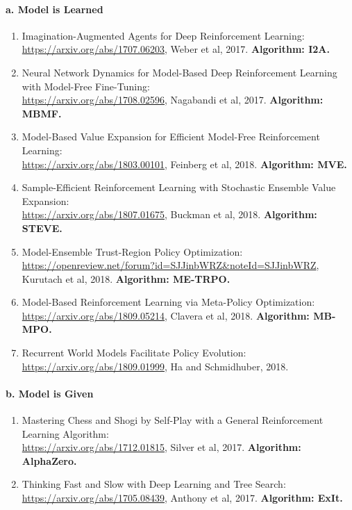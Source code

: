 \documentclass[lang=cn,11pt,a4paper]{elegant_template}
\begin{document}
\paragraph{a. Model is Learned}
\begin{enumerate}
    \item Imagination-Augmented Agents for Deep Reinforcement Learning:\\ \href{https://arxiv.org/abs/1707.06203}{https://arxiv.org/abs/1707.06203}, Weber et al, 2017. \textbf{Algorithm: I2A.}
    \item Neural Network Dynamics for Model-Based Deep Reinforcement Learning with Model-Free Fine-Tuning:\\ \href{https://arxiv.org/abs/1708.02596}{https://arxiv.org/abs/1708.02596}, Nagabandi et al, 2017. \textbf{Algorithm: MBMF.}
    \item Model-Based Value Expansion for Efficient Model-Free Reinforcement Learning:\\ \href{https://arxiv.org/abs/1803.00101}{https://arxiv.org/abs/1803.00101}, Feinberg et al, 2018. \textbf{Algorithm: MVE.}
    \item Sample-Efficient Reinforcement Learning with Stochastic Ensemble Value Expansion:\\ \href{https://arxiv.org/abs/1807.01675}{https://arxiv.org/abs/1807.01675}, Buckman et al, 2018. \textbf{Algorithm: STEVE.}
    \item Model-Ensemble Trust-Region Policy Optimization:\\ \href{https://openreview.net/forum?id=SJJinbWRZ&noteId=SJJinbWRZ}{https://openreview.net/forum?id=SJJinbWRZ\&noteId=SJJinbWRZ}, Kurutach et al, 2018. \textbf{Algorithm: ME-TRPO.}
    \item Model-Based Reinforcement Learning via Meta-Policy Optimization:\\ \href{https://arxiv.org/abs/1809.05214}{https://arxiv.org/abs/1809.05214}, Clavera et al, 2018. \textbf{Algorithm: MB-MPO.}
    \item Recurrent World Models Facilitate Policy Evolution:\\ \href{https://arxiv.org/abs/1809.01999}{https://arxiv.org/abs/1809.01999}, Ha and Schmidhuber, 2018.
\end{enumerate}


\paragraph{b. Model is Given}
\begin{enumerate}
    \item Mastering Chess and Shogi by Self-Play with a General Reinforcement Learning Algorithm:\\ \href{https://arxiv.org/abs/1712.01815}{https://arxiv.org/abs/1712.01815}, Silver et al, 2017. \textbf{Algorithm: AlphaZero.}
    \item Thinking Fast and Slow with Deep Learning and Tree Search:\\ \href{https://arxiv.org/abs/1705.08439}{https://arxiv.org/abs/1705.08439}, Anthony et al, 2017. \textbf{Algorithm: ExIt.}
\end{enumerate}
\end{document}
